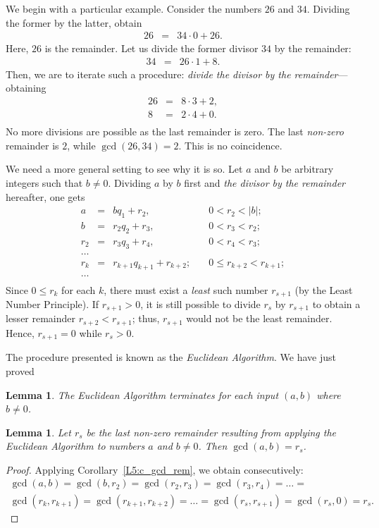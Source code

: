 \documentclass[12pt,notitlepage]{article}
\theoremstyle{plain}
\newtheorem{lemma}[thm]{Lemma}
\theoremstyle{definition}
\theoremstyle{plain}
\newcommand{\1}{\mathbf{1}}
\newcommand{\0}{\mathbf{0}}
\begin{document}
We begin with a particular example. Consider the numbers $26$ and $34$. Dividing the former by the latter, obtain
$$
\begin{array}{lcl}
26 &=& 34\cdot0 + 26.
\end{array}
$$
Here, $26$ is the remainder. Let us divide the former divisor $34$ by the remainder:
$$
\begin{array}{lcl}
34 &=& 26 \cdot 1 + 8.
\end{array}
$$
Then, we are to iterate such a procedure: \emph{divide the divisor by the remainder}---obtaining
$$
\begin{array}{lcl}
26 &=& 8 \cdot 3 + 2,\\
8 &=& 2 \cdot 4 + 0.\\
\end{array}
$$
No more divisions are possible as the last remainder is zero. The last \emph{non-zero} remainder is $2$, while $\gcd(26,34) = 2$. This is no coincidence.

We need a more general setting to see why it is so. Let $a$ and $b$ be arbitrary integers such that $b \neq 0$. Dividing $a$ by $b$ first and \emph{the divisor by the remainder} hereafter, one gets
$$\begin{array}{lcll}
a &=& bq_1 + r_2,\quad &0 < r_2 < |b|;\\
b &=& r_2 q_2 + r_3,\quad &0 < r_3 < r_2;\\
r_2 &=& r_3 q_3 + r_4,\quad &0 < r_4 < r_3;\\
\ldots&&&\\
r_{k} &=& r_{k + 1} q_{k + 1} + r_{k+2};\quad &0\leqslant r_{k+2} < r_{k+1};\\
\ldots&&&\\
\end{array}$$
Since $0 \leq r_k$ for each $k$, there must exist a \emph{least} such number $r_{s+1}$ (by the Least Number Principle). If $r_{s+1} > 0$, it is still possible to divide $r_{s}$ by $r_{s+1}$ to obtain a lesser remainder $r_{s+2} < r_{s+1}$; thus, $r_{s+1}$ would not be the least remainder. Hence, $r_{s+1} = 0$ while $r_s > 0$.

The procedure presented is known as the \emph{Euclidean Algorithm}. We have just proved 
\begin{lemma}
The Euclidean Algorithm terminates for each input $(a, b)$ where $b \neq 0$.
\end{lemma}

\begin{lemma}
Let $r_s$ be the last non-zero remainder resulting from applying the Euclidean Algorithm to numbers $a$ and $b \neq 0$. Then $\gcd(a, b)= r_s$. 
\end{lemma}
\begin{proof}
Applying Corollary~\ref{L5:c_gcd_rem}, we obtain consecutively:
\begin{multline*}
\gcd(a, b) = \gcd(b, r_2) = \gcd(r_2, r_3) = \gcd(r_3, r_4) = \ldots =\\
\gcd(r_{k}, r_{k+1}) = \gcd(r_{k+1}, r_{k+2}) = \ldots = \gcd(r_s, r_{s+1}) = \gcd(r_s, 0) = r_s.
\end{multline*}
\end{proof}
\end{document}
